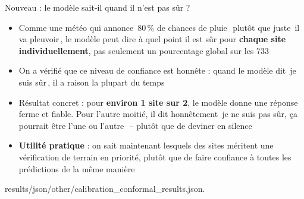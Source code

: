 \documentclass[11pt,aspectratio=169]{beamer}
\newcommand{\source}[1]{{\tiny\color{graytext}#1}}
\begin{document}
\begin{frame}{Nouveau : le mod\`ele sait-il quand il n'est pas s\^ur ?}
  \footnotesize
  \begin{itemize}
    \setlength\itemsep{0.6em}
    \item Comme une m\'et\'eo qui annonce \guillemotleft\,80\,\% de chances de
      pluie\,\guillemotright\ plut\^ot que juste \guillemotleft\,il va
      pleuvoir\,\guillemotright, le mod\`ele peut dire \`a quel point il est s\^ur
      pour \textbf{chaque site individuellement}, pas seulement un pourcentage
      global sur les 733
    \item On a v\'erifi\'e que ce niveau de confiance est honn\^ete : quand le
      mod\`ele dit \guillemotleft\,je suis s\^ur\,\guillemotright, il a raison la
      plupart du temps
    \item R\'esultat concret : pour \textbf{environ 1 site sur 2}, le mod\`ele donne
      une r\'eponse ferme et fiable. Pour l'autre moiti\'e, il dit honn\^etement
      \guillemotleft\,je ne suis pas s\^ur, \c{c}a pourrait \^etre l'une ou
      l'autre\,\guillemotright\ -- plut\^ot que de deviner en silence
    \item \textbf{Utilit\'e pratique} : on sait maintenant lesquels des sites
      m\'eritent une v\'erification de terrain en priorit\'e, plut\^ot que de faire
      confiance \`a toutes les pr\'edictions de la m\^eme mani\`ere
  \end{itemize}
  \vfill
  \source{results/json/other/calibration\_conformal\_results.json.}
\end{frame}
\end{document}
